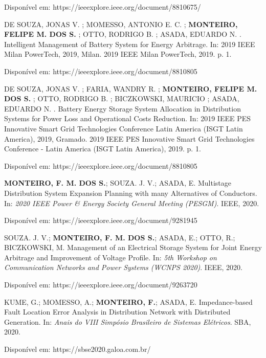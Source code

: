 \noindent Disponível em:
https://ieeexplore.ieee.org/document/8810675/

\vspace{1cm}
\noindent DE SOUZA, JONAS V. ; MOMESSO, ANTONIO E. C. ; \textbf{MONTEIRO, FELIPE M. DOS S.} ; OTTO, RODRIGO B. ; ASADA, EDUARDO N. . Intelligent Management of Battery System for Energy Arbitrage. In: 2019 IEEE Milan PowerTech, 2019, Milan. 2019 IEEE Milan PowerTech, 2019. p. 1. 

\noindent Disponível em:
https://ieeexplore.ieee.org/document/8810805

\vspace{1cm}
\noindent  DE SOUZA, JONAS V. ; FARIA, WANDRY R. ; \textbf{MONTEIRO, FELIPE M. DOS S.} ; OTTO, RODRIGO B. ; BICZKOWSKI, MAURICIO ; ASADA, EDUARDO N. . Battery Energy Storage System Allocation in Distribution Systems for Power Loss and Operational Costs Reduction. In: 2019 IEEE PES Innovative Smart Grid Technologies Conference Latin America (ISGT Latin America), 2019, Gramado. 2019 IEEE PES Innovative Smart Grid Technologies Conference - Latin America (ISGT Latin America), 2019. p. 1. 

\noindent Disponível em:
https://ieeexplore.ieee.org/document/8810805

\vspace{1cm}
\noindent \textbf{MONTEIRO, F. M. DOS S.}; SOUZA. J. V.; ASADA, E. Multistage Distribution System Expansion Planning with many Alternatives of Conductors. In: \textit{ 2020 IEEE Power \& Energy Society General Meeting (PESGM)}. IEEE, 2020. 

\noindent Disponível em: https://ieeexplore.ieee.org/document/9281945

\vspace{1cm}
\noindent SOUZA. J. V.; \textbf{MONTEIRO, F. M. DOS S.};  ASADA, E.; OTTO, R.; BICZKOWSKI, M. Management of an Electrical Storage System for Joint Energy Arbitrage and Improvement of Voltage Profile. In: \textit{5th Workshop on Communication Networks and Power Systems (WCNPS 2020)}. IEEE, 2020. 

\noindent Disponível em:  https://ieeexplore.ieee.org/document/9263720
\newpage

\vspace{1cm}
\noindent KUME, G.; MOMESSO, A.; \textbf{MONTEIRO, F.}; ASADA, E. Impedance-based Fault Location Error Analysis in Distribution Network with Distributed Generation. In: \textit{Anais do VIII Simpósio Brasileiro de Sistemas Elétricos}. SBA, 2020.

\noindent Disponível em: https://sbse2020.galoa.com.br/


